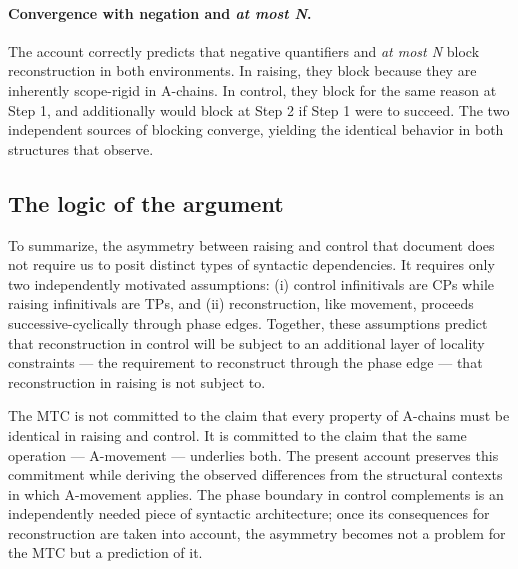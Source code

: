 \documentclass[12pt]{article}
\begin{document}
\paragraph{Convergence with negation and \emph{at most N}.} The account correctly predicts that negative quantifiers and \emph{at most N} block reconstruction in both environments. In raising, they block because they are inherently scope-rigid in A-chains. In control, they block for the same reason at Step 1, and additionally would block at Step 2 if Step 1 were to succeed. The two independent sources of blocking converge, yielding the identical behavior in both structures that \citeauthor{neeleman2006} observe.

\subsection{The logic of the argument}\label{sec:logic}

To summarize, the asymmetry between raising and control that \citeauthor{neeleman2006} document does not require us to posit distinct types of syntactic dependencies. It requires only two independently motivated assumptions: (i) control infinitivals are CPs while raising infinitivals are TPs, and (ii) reconstruction, like movement, proceeds successive-cyclically through phase edges. Together, these assumptions predict that reconstruction in control will be subject to an additional layer of locality constraints --- the requirement to reconstruct through the phase edge --- that reconstruction in raising is not subject to.

The MTC is not committed to the claim that every property of A-chains must be identical in raising and control. It is committed to the claim that the same operation --- A-movement --- underlies both. The present account preserves this commitment while deriving the observed differences from the structural contexts in which A-movement applies. The phase boundary in control complements is an independently needed piece of syntactic architecture; once its consequences for reconstruction are taken into account, the asymmetry becomes not a problem for the MTC but a prediction of it.

\printbibliography
\end{document}
